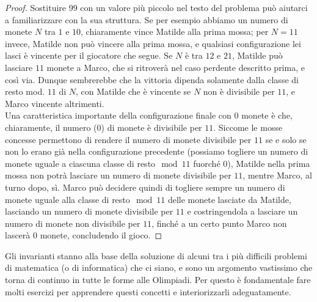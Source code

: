 \documentclass[11pt]{scrartcl}
\begin{document}
	\begin{proof}
		Sostituire $99$ con un valore più piccolo nel testo del problema può aiutarci a familiarizzare con la sua struttura. Se per esempio abbiamo un numero di monete $N$ tra $1$ e $10$, chiaramente vince Matilde alla prima mossa; per $N=11$ invece, Matilde non può vincere alla prima mossa, e qualsiasi configurazione lei lasci è vincente per il giocatore che segue. Se $N$ è tra $12$ e $21$, Matilde può lasciare $11$ monete a Marco, che si ritroverà nel caso perdente descritto prima, e così via.
		Dunque sembrerebbe che la vittoria dipenda solamente dalla classe di resto mod. $11$ di $N$, con Matilde che è vincente se $N$ non è divisibile per $11$, e Marco vincente altrimenti.
		\\ Una caratteristica importante della configurazione finale con $0$ monete è che, chiaramente, il numero ($0$) di monete è divisibile per $11$. Siccome le mosse concesse permettono di rendere il numero di monete divisibile per $11$ se e solo se non lo erano già nella configurazione precedente (possiamo togliere un numero di monete uguale a ciascuna classe di resto$\mod11$ fuorché $0$), Matilde nella prima mossa non potrà lasciare un numero di monete divisibile per $11$, mentre Marco, al turno dopo, sì. Marco può decidere quindi di togliere sempre un numero di monete uguale alla classe di resto$\mod11$ delle monete lasciate da Matilde, lasciando un numero di monete divisibile per $11$ e costringendola a lasciare un numero di monete non divisibile per $11$, finché a un certo punto Marco non lascerà $0$ monete, concludendo il gioco.
	\end{proof}
	
	Gli invarianti stanno alla base della soluzione di alcuni tra i più difficili problemi di matematica (o di informatica) che ci siano, e sono un argomento vastissimo che torna di continuo in tutte le forme alle Olimpiadi. Per questo è fondamentale fare molti esercizi per apprendere questi concetti e interiorizzarli adeguatamente.
\end{document}

